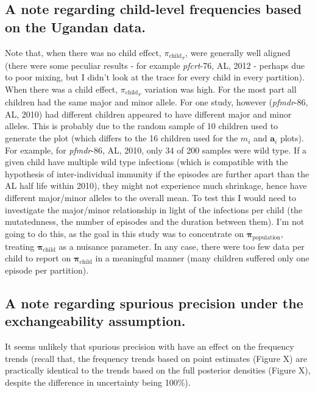 \documentclass[letterpaper]{article}
\begin{document}
 
\subsection{A note regarding child-level frequencies based on the Ugandan data.}
Note that, when there was no child effect, ${\pi_{\text{child}}}_{r}$, were generally well aligned (there were some peculiar results - for example \textit{pfcrt}-76, AL, 2012 - perhaps due to poor mixing, but I didn't look at the trace for every child in every partition). When there was a child effect, ${\pi_{\text{child}}}_{r}$ variation was high. For the most part all children had the same major and minor allele. For one study, however (\textit{pfmdr}-86, AL, 2010) had different children appeared to have different major and minor alleles. This is probably due to the random sample of 10 children used to generate the plot (which differs to the 16 children used for the $m_i$ and $\bm{a}_i$ plots). For example, for \textit{pfmdr}-86, AL, 2010, only 34 of 200 samples were wild type. If a given child have multiple wild type infections (which is compatible with the hypothesis of inter-individual immunity if the episodes are further apart than the AL half life within 2010), they might not experience much shrinkage, hence have different major/minor alleles to the overall mean. To test this I would need to investigate the major/minor relationship in light of the infections per child (the mutatednness, the number of episodes and the duration between them). I'm not going to do this, as the goal in this study was to concentrate on $\bm{\pi}_{\text{population}}$, treating $\bm{\pi}_{\text{child}}$ as a nuisance parameter. In any case, there were too few data per child to report on $\bm{\pi}_{\text{child}}$ in a meaningful manner (many children suffered only one episode per partition).

\subsection{A note regarding spurious precision under the exchangeability assumption.}
It seems unlikely that spurious precision with have an effect on the frequency trends (recall that, the frequency trends based on point estimates (Figure X) are practically identical to the trends based on the full posterior densities (Figure X), despite the difference in uncertainty being 100\%). 
\end{document}
